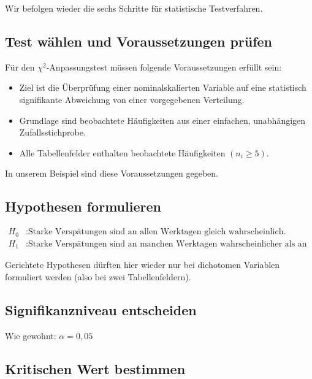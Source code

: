 \documentclass[
  11pt,
  ngerman,
  a4paper,
]{report}
\providecommand{\tightlist}{%
  \setlength{\itemsep}{0pt}\setlength{\parskip}{0pt}}
\begin{document}
Wir befolgen wieder die sechs Schritte für statistische Testverfahren.

\hypertarget{test-wuxe4hlen-und-voraussetzungen-pruxfcfen-5}{%
\subsection{Test wählen und Voraussetzungen prüfen}\label{test-wuxe4hlen-und-voraussetzungen-pruxfcfen-5}}

Für den \(\chi^2\)-Anpassungstest müssen folgende Voraussetzungen erfüllt sein:

\begin{itemize}
\tightlist
\item
  Ziel ist die Überprüfung einer nominalskalierten Variable auf eine statistisch signifikante Abweichung von einer vorgegebenen Verteilung.
\item
  Grundlage sind beobachtete Häufigkeiten aus einer einfachen, unabhängigen Zufallsstichprobe.
\item
  Alle Tabellenfelder enthalten beobachtete Häufigkeiten \((n_{i}\geq 5)\).
\end{itemize}

In unserem Beispiel sind diese Voraussetzungen gegeben.

\hypertarget{hypothesen-formulieren-5}{%
\subsection{Hypothesen formulieren}\label{hypothesen-formulieren-5}}

\[\begin{aligned}
H_0 &: \textrm{Starke Verspätungen sind an allen Werktagen gleich wahrscheinlich.}\\
H_1 &: \textrm{Starke Verspätungen sind an manchen Werktagen wahrscheinlicher als an anderen.}
\end{aligned}\]

Gerichtete Hypothesen dürften hier wieder nur bei dichotomen Variablen formuliert werden (also bei zwei Tabellenfeldern).

\hypertarget{signifikanzniveau-entscheiden-5}{%
\subsection{Signifikanzniveau entscheiden}\label{signifikanzniveau-entscheiden-5}}

Wie gewohnt: \(\alpha=0{,}05\)

\hypertarget{kritischen-wert-bestimmen-1}{%
\subsection{Kritischen Wert bestimmen}\label{kritischen-wert-bestimmen-1}}
\end{document}
